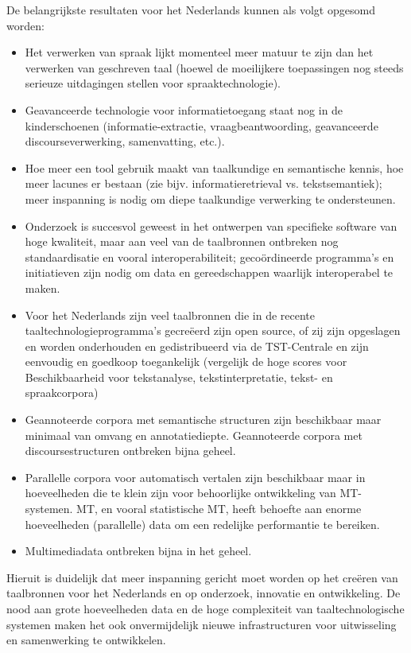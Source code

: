 \begin{multicols}{2}
De belangrijkste resultaten voor het Nederlands kunnen als volgt opgesomd worden:
\begin{itemize}
   \item Het verwerken van spraak lijkt momenteel meer matuur te zijn dan het verwerken van geschreven taal (hoewel de moeilijkere toepassingen nog steeds serieuze uitdagingen stellen voor spraaktechnologie).
   \item Geavanceerde technologie voor informatietoegang staat nog in de kinderschoenen (informatie-extractie, vraagbeantwoording, geavanceerde discourseverwerking, samenvatting, etc.).
   \item Hoe meer een tool gebruik maakt van taalkundige en semantische kennis, hoe meer lacunes er bestaan (zie bijv. informatieretrieval vs. tekstsemantiek); meer inspanning is nodig om diepe taalkundige verwerking te ondersteunen.
   \item Onderzoek is succesvol geweest in het ontwerpen van specifieke software van hoge kwaliteit, maar aan veel van de taalbronnen ontbreken nog standaardisatie en vooral interoperabiliteit; geco{\"o}rdineerde programma's en initiatieven zijn nodig om data en gereedschappen waarlijk interoperabel te maken.
   \item Voor het Nederlands zijn veel taalbronnen die in de recente taaltechnologieprogramma's gecre{\"e}erd zijn open source, of zij zijn opgeslagen en worden onderhouden en gedistribueerd via de TST-Centrale en zijn eenvoudig en goedkoop toegankelijk (vergelijk de hoge scores voor Beschikbaarheid voor tekstanalyse, tekstinterpretatie, tekst- en spraakcorpora)
   \item Geannoteerde corpora met semantische structuren zijn beschikbaar maar minimaal van omvang en annotatiediepte. Geannoteerde corpora met discoursestructuren ontbreken bijna geheel.
   \item Parallelle corpora voor automatisch vertalen zijn beschikbaar maar in hoeveelheden die te klein zijn voor behoorlijke ontwikkeling van MT-systemen. MT, en vooral statistische MT, heeft behoefte aan enorme hoeveelheden (parallelle) data om een redelijke performantie te bereiken.
   \item Multimediadata ontbreken bijna in het geheel.
   \end{itemize}

Hieruit is duidelijk dat meer inspanning gericht moet worden op het cre{\"e}ren van taalbronnen voor het Nederlands en op onderzoek, innovatie en ontwikkeling. De nood aan grote hoeveelheden data en de hoge complexiteit van taaltechnologische systemen maken het ook onvermijdelijk nieuwe infrastructuren voor uitwisseling en samenwerking te ontwikkelen.


\end{multicols}
